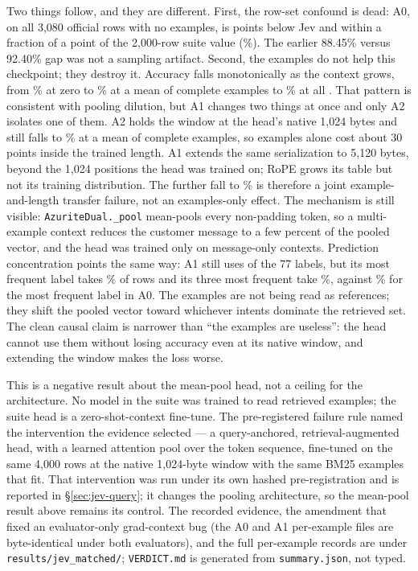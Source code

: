 Two things follow, and they are different. First, the row-set confound is dead:
A0, on all 3{,}080 official rows with no examples, is \JevMatchGapPrimary{}
points below Jev and within a fraction of a point of the 2{,}000-row suite
value (\SuiteLargeBank\%). The earlier 88.45\% versus 92.40\%
gap was not a sampling artifact. Second, the examples do not help this
checkpoint; they destroy it. Accuracy falls monotonically as the context grows,
from \JevMatchPctNoEx\% at zero to \JevMatchPctATwo\% at a
mean of \JevMatchEffATwo{} complete examples to \JevMatchPctAOne\% at all
\JevMatchEffAOne. That pattern is consistent with pooling dilution, but A1 changes two things at
once and only A2 isolates one of them. A2 holds the window at the head's native
1{,}024 bytes and still falls to \JevMatchPctATwo\% at a mean of
\JevMatchEffATwo{} complete examples, so examples alone cost about 30 points
inside the trained length. A1 extends the same serialization to 5{,}120 bytes,
beyond the 1{,}024 positions the head was trained on; RoPE grows its table but
not its training distribution. The further fall to \JevMatchPctAOne\% is
therefore a joint example-and-length transfer failure, not an examples-only
effect. The mechanism is still visible: \texttt{AzuriteDual.\_pool} mean-pools
every non-padding token, so a multi-example context reduces the customer message
to a few percent of the pooled vector, and the head was trained only on
message-only contexts. Prediction concentration points the same way: A1 still
uses \JevMatchDistinctAOne{} of the 77 labels, but its most frequent label takes
\JevMatchTopAOne\% of rows and its three most frequent take
\JevMatchTopThreeAOne\%, against \JevMatchTopNoEx\% for the most frequent label
in A0. The examples are not being read as references; they shift the pooled
vector toward whichever intents dominate the retrieved set. The clean causal
claim is narrower than ``the examples are useless'': the head cannot use them
without losing accuracy even at its native window, and extending the window
makes the loss worse.

This is a negative result about the mean-pool head, not a ceiling for the
architecture. No model in the suite was trained to read retrieved examples; the
suite head is a zero-shot-context fine-tune. The pre-registered failure rule
named the intervention the evidence selected --- a query-anchored,
retrieval-augmented head, with a learned attention pool over the token sequence,
fine-tuned on the same 4{,}000 rows at the native 1{,}024-byte window with the
same BM25 examples that fit. That intervention was run under its own hashed
pre-registration and is reported in \S\ref{sec:jev-query}; it changes the
pooling architecture, so the mean-pool result above remains its control. The recorded evidence, the amendment that fixed an
evaluator-only grad-context bug (the A0 and A1 per-example files are
byte-identical under both evaluators), and the full per-example records are
under \texttt{results/jev\_matched/}; \texttt{VERDICT.md} is generated from
\texttt{summary.json}, not typed.


